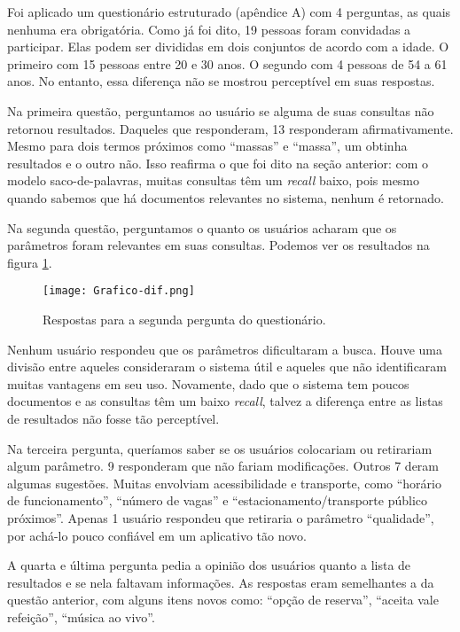 Foi aplicado um questionário estruturado (apêndice A) com 4 perguntas, as quais nenhuma era obrigatória. Como já foi dito, 19 pessoas foram convidadas a participar. Elas podem ser divididas em dois conjuntos de acordo com a idade. O primeiro com 15 pessoas entre 20 e 30 anos. O segundo com 4 pessoas de 54 a 61 anos. No entanto, essa diferença não se mostrou perceptível em suas respostas.

Na primeira questão, perguntamos ao usuário se alguma de suas consultas não retornou resultados. Daqueles que responderam, 13 responderam afirmativamente. Mesmo para dois termos próximos como ``massas'' e ``massa'', um obtinha resultados e o outro não. Isso reafirma o que foi dito na seção anterior: com o modelo saco-de-palavras, muitas consultas têm um \emph{recall} baixo, pois mesmo quando sabemos que há documentos relevantes no sistema, nenhum é retornado.

Na segunda questão, perguntamos o quanto os usuários acharam que os parâmetros foram relevantes em suas consultas. Podemos ver os resultados na figura \ref{fig:grafsegperg}.

\begin{figure}[!h]
  \centering
  \texttt{[image: Grafico-dif.png]} 
  \caption{Respostas para a segunda pergunta do questionário.}
  \label{fig:grafsegperg}
\end{figure}

Nenhum usuário respondeu que os parâmetros dificultaram a busca. Houve uma divisão entre aqueles consideraram o sistema útil e aqueles que não identificaram muitas vantagens em seu uso. Novamente, dado que o sistema tem poucos documentos e as consultas têm um baixo \emph{recall}, talvez a diferença entre as listas de resultados não fosse tão perceptível.

Na terceira pergunta, queríamos saber se os usuários colocariam ou retirariam algum parâmetro. 9 responderam que não fariam modificações. Outros 7 deram algumas sugestões. Muitas envolviam acessibilidade e transporte, como ``horário de funcionamento'', ``número de vagas'' e ``estacionamento/transporte público próximos''. Apenas 1 usuário respondeu que retiraria o parâmetro ``qualidade'', por achá-lo pouco confiável em um aplicativo tão novo. 

A quarta e última pergunta pedia a opinião dos usuários quanto a lista de resultados e se nela faltavam informações. As respostas eram semelhantes a da questão anterior, com alguns itens novos como: ``opção de reserva'', ``aceita vale refeição'', ``música ao vivo''.

